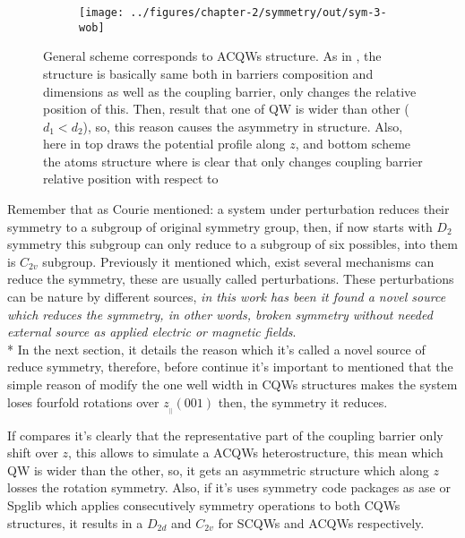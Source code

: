 \begin{figure}[h!]
	\centering
	\begin{subfigure}{\textwidth}
	\texttt{[image: ../figures/chapter-2/symmetry/out/sym-3-wob]}
	\label{subfig:subsubsec:chapter-2-acoupled-quantum-wells-a}
	\label{subfig:subsubsec:chapter-2-acoupled-quantum-wells-b}
	\end{subfigure}
	\caption[CB,VB]
	{General scheme corresponds to \gls{ACQWs} structure.
	As in , the structure is basically same both in barriers composition and dimensions as well as the coupling barrier, only changes the relative position of this. Then, result that one of \gls{QW} is wider than other ($d_{1}<d_{2}$), so, this reason causes the asymmetry in structure. Also, here in top 
	 draws the potential profile along $z$, and bottom 
	 scheme the atoms structure where is clear that only changes coupling barrier relative position with respect to 
	}\label{fig:subsubsec:chapter-2-acoupled-quantum-wells}
\end{figure}

Remember that as Courie mentioned\cite{curie1894symetrie,sep-symmetry-breaking,shubnikov1988works}:  a system under perturbation reduces their symmetry to a subgroup of  original symmetry group, then, if now starts with $D_{2}$ symmetry this subgroup can only reduce to a subgroup of six possibles, into them is $C_{2v}$ subgroup. Previously it mentioned which, exist several mechanisms can reduce the symmetry, these are usually called  perturbations. These perturbations can be nature by different sources, \emph{in this work  has been it found a novel source which reduces the symmetry,  in other words,  broken symmetry  without needed external source as applied electric or magnetic fields}.  \\*
In the next section, it details the reason which it's called  a novel source of reduce symmetry, therefore, before continue it's important to mentioned that the simple reason of modify the one well width in CQWs structures makes the system loses fourfold rotations over $z_{_{\parallel}}(001)$  then, the symmetry it reduces. 

If compares  it's clearly that the representative part of the coupling barrier only shift over $z$, this allows to simulate a \gls{ACQWs} heterostructure, this mean which QW is wider than the other, so, it gets an asymmetric structure which along $z$ losses the rotation symmetry. Also, if it's uses symmetry code packages as \gls{ase} or \gls{Spglib} which applies consecutively symmetry operations to both CQWs structures, it results in a $D_{2d}$ and $C_{2v}$ for \gls{SCQWs} and \gls{ACQWs} respectively.  
 
